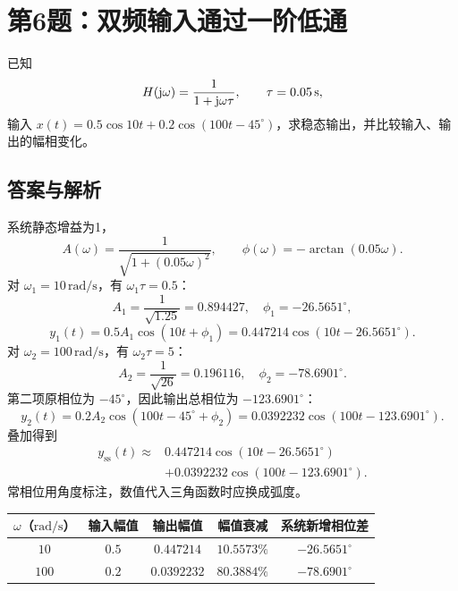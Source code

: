 
\section{第6题：双频输入通过一阶低通}
\label{hw:5-6}

\begin{hwquestion}
已知
\[
H(\mathrm{j}\omega)=\frac1{1+\mathrm{j}\omega\tau},\qquad\tau=0.05\,\mathrm s,
\]
输入 $x(t)=0.5\cos10t+0.2\cos(100t-45^\circ)$，求稳态输出，并比较输入、输出的幅相变化。
\end{hwquestion}

\subsection*{答案与解析}
系统静态增益为1，
\[
A(\omega)=\frac1{\sqrt{1+(0.05\omega)^2}},\qquad
\phi(\omega)=-\arctan(0.05\omega).
\]
对 $\omega_1=10\,\mathrm{rad/s}$，有 $\omega_1\tau=0.5$：
\[
A_1=\frac1{\sqrt{1.25}}=0.894427,
\quad\phi_1=-26.5651^\circ,
\]
\[
y_1(t)=0.5A_1\cos(10t+\phi_1)
=0.447214\cos(10t-26.5651^\circ).
\]
对 $\omega_2=100\,\mathrm{rad/s}$，有 $\omega_2\tau=5$：
\[
A_2=\frac1{\sqrt{26}}=0.196116,
\quad\phi_2=-78.6901^\circ.
\]
第二项原相位为 $-45^\circ$，因此输出总相位为 $-123.6901^\circ$：
\[
y_2(t)=0.2A_2\cos(100t-45^\circ+\phi_2)
=0.0392232\cos(100t-123.6901^\circ).
\]
叠加得到
\[
\boxed{\begin{aligned}
y_{\mathrm{ss}}(t)\approx{}&0.447214\cos(10t-26.5651^\circ)\\
&+0.0392232\cos(100t-123.6901^\circ).
\end{aligned}}
\]
常相位用角度标注，数值代入三角函数时应换成弧度。

\begin{table}[H]
\centering\small
\begin{tabular}{@{}c c c c c@{}}
\toprule
$\omega$（$\mathrm{rad/s}$） & 输入幅值 & 输出幅值 & 幅值衰减 & 系统新增相位差 \\
\midrule
$10$ & $0.5$ & $0.447214$ & $10.5573\%$ & $-26.5651^\circ$ \\
$100$ & $0.2$ & $0.0392232$ & $80.3884\%$ & $-78.6901^\circ$ \\
\bottomrule
\end{tabular}
\end{table}

